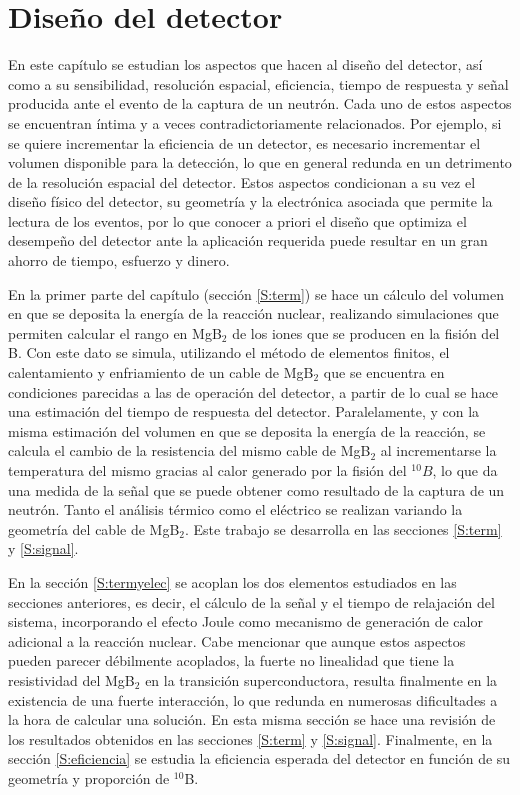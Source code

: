 \chapter{Diseño del detector}\label{C:dise}
\graphicspath{{figs/dise/}}

En este capítulo se estudian los aspectos que hacen al diseño del detector, así como a su sensibilidad, resolución espacial, eficiencia, tiempo de respuesta y señal producida ante el evento de la captura de un neutrón. Cada uno de estos aspectos se encuentran íntima y a veces contradictoriamente relacionados. Por ejemplo, si se quiere incrementar la eficiencia de un detector, es necesario incrementar el volumen disponible para la detección, lo que en general redunda en un detrimento de la resolución espacial del detector. Estos aspectos condicionan a su vez el diseño físico del detector, su geometría y la electrónica asociada que permite la lectura de los eventos, por lo que conocer a priori el diseño que optimiza el desempeño del detector ante la aplicación requerida puede resultar en un gran ahorro de tiempo, esfuerzo y dinero.

En la primer parte del capítulo (sección \ref{S:term}) se hace un cálculo del volumen en que se deposita la energía de la reacción nuclear, realizando simulaciones que permiten calcular el rango en MgB$_{2}$ de los iones que se producen en la fisión del B. Con este dato se simula, utilizando el método de elementos finitos, el calentamiento y enfriamiento de un cable de MgB$_{2}$ que se encuentra en condiciones parecidas a las de operación del detector, a partir de lo cual se hace una estimación del tiempo de respuesta del detector. Paralelamente, y con la misma estimación del volumen en que se deposita la energía de la reacción, se calcula el cambio de la resistencia del mismo cable de MgB$_{2}$ al incrementarse la temperatura del mismo gracias al calor generado por la fisión del $^{10}B$, lo que da una medida de la señal que se puede obtener como resultado de la captura de un neutrón. Tanto el análisis térmico como el eléctrico se realizan variando la geometría del cable de MgB$_{2}$. Este trabajo se desarrolla en las secciones \ref{S:term} y \ref{S:signal}.

En la sección \ref{S:termyelec} se acoplan los dos elementos estudiados en las secciones an\-te\-rio\-res, es decir, el cálculo de la señal y el tiempo de relajación del sistema, incorporando el efecto Joule como mecanismo de generación de calor adicional a la reacción nuclear. Cabe mencionar que aunque estos aspectos pueden parecer débilmente acoplados, la fuerte no linealidad que tiene la resistividad del MgB$_{2}$ en la transición superconductora, resulta finalmente en la existencia de una fuerte interacción, lo que redunda en numerosas dificultades a la hora de calcular una solución. En esta misma sección se hace una revisión de los resultados obtenidos en las secciones \ref{S:term} y \ref{S:signal}. Finalmente, en
\newpage
\noindent
la sección \ref{S:eficiencia} se estudia la eficiencia esperada del detector en función de su geometría y proporción de $^{10}$B.
